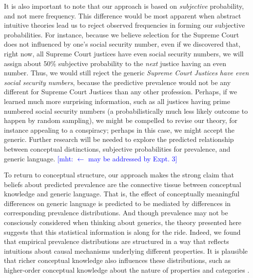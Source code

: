 \documentclass[12pt,letterpaper]{article}
\newcommand{\mht}[1]{\textcolor{Blue}{[mht: #1]}}
\begin{document}
It is also important to note that our approach is based on \emph{subjective} probability, and not mere frequency.
This difference would be most apparent when abstract intuitive theories lead us to reject observed frequencies in forming our subjective probabilities. 
For instance, because we believe selection for the Supreme Court does not influenced by one's social security number, even if we discovered that, right now, all Supreme Court justices have even social security numbers, we will assign about 50\% subjective probability to the \emph{next} justice having an even number.
Thus, we would still reject the generic \emph{Supreme Court Justices have even social security numbers}, because the predictive prevalence would not be any different for Supreme Court Justices than any other profession. 
Perhaps, if we learned much more surprising information, such as all justices having prime numbered social security numbers (a probabilistically much less likely outcome to happen by random sampling), we might be compelled to revise our theory, for instance appealing to a conspiracy; perhaps in this case, we might accept the generic.
Further research will be needed to explore the predicted relationship between conceptual distinctions, subjective probabilities for prevalence, and generic language. \mht{$\leftarrow$ may be addressed by Expt. 3}



To return to conceptual structure, our approach makes the strong claim that beliefs about predicted prevalence are the connective tissue between conceptual knowledge and generic language.
That is, the effect of conceptually meaningful differences on generic language is predicted to be mediated by differences in corresponding prevalence distributions.
And though prevalence may not be consciously considered when thinking about generics, the theory presented here suggests that this statistical information is along for the ride. 
Indeed, we found that empirical prevalence distributions are structured in a way that reflects intuitions about causal mechanisms underlying different properties.
It is plausible that richer conceptual knowledge also influences these distributions, such as higher-order conceptual knowledge about the nature of properties and categories \cite{Gelman2003,Keil1992}. 
\end{document}
